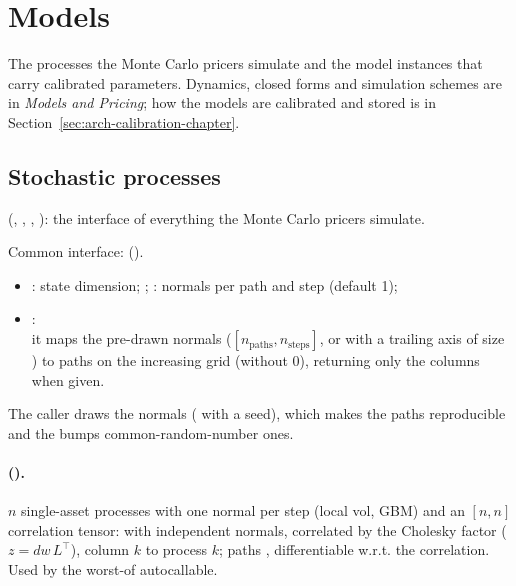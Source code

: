\section{Models}\label{sec:arch-models-chapter}
The processes the Monte Carlo pricers simulate and the model instances that carry calibrated parameters. Dynamics,
closed forms and simulation schemes are in \emph{Models and Pricing}; how the models are calibrated and stored is in
Section~\ref{sec:arch-calibration-chapter}.

\subsection{Stochastic processes}\label{sec:arch-models}
 (, , , ): the interface of
everything the Monte Carlo pricers simulate.

Common interface:  ().
\begin{itemize}[nosep]
  \item {}: state dimension; ; : normals per path and step
        (default 1);
  \item {}:\\ it maps the pre-drawn normals 
        ($[n_{\text{paths}}, n_{\text{steps}}]$, or with a trailing axis of size ) to paths on the increasing
        grid  (without 0), returning only the  columns when given.
\end{itemize}
The caller draws the normals
( with a seed), which makes the paths reproducible and the bumps common-random-number
ones. 

\paragraph{ ().} $n$ single-asset processes with one normal per step
(local vol, GBM) and an $[n, n]$ correlation tensor:  with 
 independent normals, correlated by the Cholesky factor ($z = dw\,L^\top$), column $k$
to process $k$; paths , differentiable w.r.t. the correlation. Used by the worst-of
autocallable.

